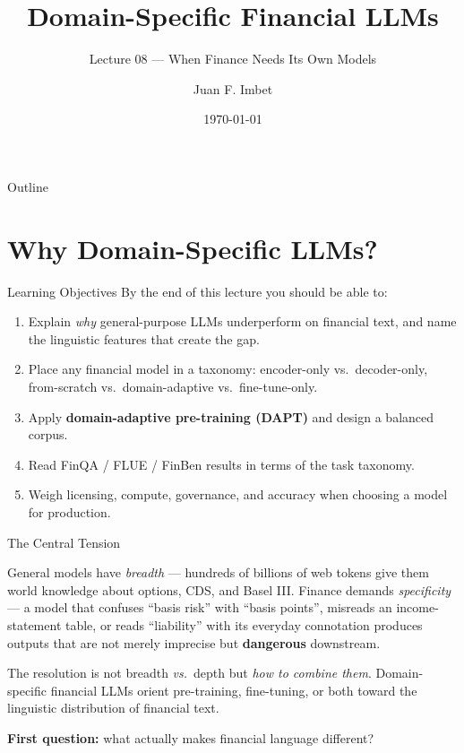 \documentclass[9pt,t]{beamer}
\title{Domain-Specific Financial LLMs}
\subtitle{Lecture 08 --- When Finance Needs Its Own Models}
\author{Juan F. Imbet}
\institute{Paris Dauphine -- PSL University}
\date{\today}
\begin{document}
\begin{frame}\titlepage\end{frame}

\begin{frame}{Outline}\tableofcontents\end{frame}

\section{Why Domain-Specific LLMs?}

\begin{frame}{Learning Objectives}
By the end of this lecture you should be able to:
\begin{enumerate}
  \item Explain \textit{why} general-purpose LLMs underperform on financial text,
        and name the linguistic features that create the gap.
  \item Place any financial model in a taxonomy: encoder-only vs.\ decoder-only,
        from-scratch vs.\ domain-adaptive vs.\ fine-tune-only.
  \item Apply \textbf{domain-adaptive pre-training (DAPT)} and design a balanced
        corpus.
  \item Read FinQA / FLUE / FinBen results in terms of the task taxonomy.
  \item Weigh licensing, compute, governance, and accuracy when choosing a model
        for production.
\end{enumerate}
\end{frame}

\begin{frame}{The Central Tension}
\begin{bigpicture}
General models have \emph{breadth} --- hundreds of billions of web tokens give
them world knowledge about options, CDS, and Basel III.
Finance demands \emph{specificity} --- a model that confuses ``basis risk'' with
``basis points'', misreads an income-statement table, or reads ``liability'' with
its everyday connotation produces outputs that are not merely imprecise but
\textbf{dangerous} downstream.
\end{bigpicture}

\medskip
The resolution is not breadth \emph{vs.}\ depth but \emph{how to combine them}.
Domain-specific financial LLMs orient pre-training, fine-tuning, or both toward
the linguistic distribution of financial text.

\medskip
\textbf{First question:} what actually makes financial language different?
\end{frame}
\end{document}
